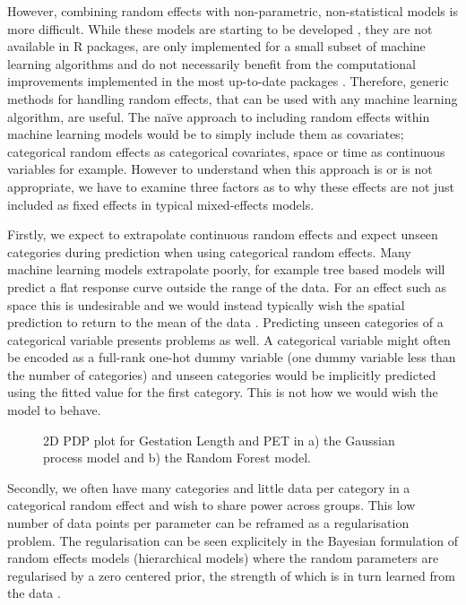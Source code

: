 \documentclass[10pt,]{article}
\begin{document}
However, combining random effects with non-parametric, non-statistical models is more difficult.
While these models are starting to be developed \citep{ngufor2019mixed, hajjem2014mixed, hajjem2017generalized, eo2014tree, miller2017gradient, REEMtree}, they are not available in R packages, are only implemented for a small subset of machine learning algorithms and do not necessarily benefit from the computational improvements implemented in the most up-to-date packages \citep{wright2015ranger, xgboost}.
Therefore, generic methods for handling random effects, that can be used with any machine learning algorithm, are useful.
The na\"{i}ve approach to including random effects within machine learning models would be to simply include them as covariates; categorical random effects as categorical covariates, space or time as continuous variables for example.
However to understand when this approach is or is not appropriate, we have to examine three factors as to why these effects are not just included as fixed effects in typical mixed-effects models.

Firstly, we expect to extrapolate continuous random effects and expect unseen categories during prediction when using categorical random effects.
Many machine learning models extrapolate poorly, for example tree based models will predict a flat response curve outside the range of the data.
For an effect such as space this is undesirable and we would instead typically wish the spatial prediction to return to the mean of the data \citep{rasmussen2004gaussian, hengl2018random}.
Predicting unseen categories of a categorical variable presents problems as well.
A categorical variable might often be encoded as a full-rank one-hot dummy variable (one dummy variable less than the number of categories) and unseen categories would be implicitly predicted using the fitted value for the first category.
This is not how we would wish the model to behave.

\begin{figure}[t!]
  \centering
  \caption{
    2D PDP plot for Gestation Length and PET in a) the Gaussian process model and b) the Random Forest model.
  }
  \label{fig:2d}
\end{figure}

Secondly, we often have many categories and little data per category in a categorical random effect and wish to share power across groups.
This low number of data points per parameter can be reframed as a regularisation problem.
The regularisation can be seen explicitely in the Bayesian formulation of random effects models (hierarchical models) where the random parameters are regularised by a zero centered prior, the strength of which is in turn learned from the data \citep{simpson2017penalising}.
\end{document}
